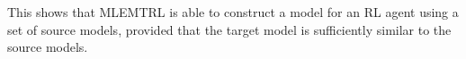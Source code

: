 This shows that MLEMTRL is able to construct a model for an RL agent using a set of source models, provided that the target model is sufficiently similar to the source models.







